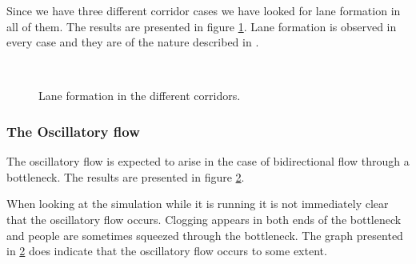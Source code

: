 Since we have three different corridor cases we have looked for lane 
formation in all of them. The results are presented in figure 
\ref{fig:laneformation}. Lane formation is observed in every case 
and they are of the nature described in \cite{self-org}.\\

\begin{figure}[h]
\centering
\subfloat[]{\resizebox{8cm}{!}{}}
\subfloat[]{\resizebox{8cm}{!}{}}\\
\subfloat[]{\resizebox{8cm}{!}{}}
\caption{Lane formation in the different corridors.}
\label{fig:laneformation}
\end{figure}

\subsubsection{The Oscillatory flow}
The oscillatory flow is expected to arise in the case of bidirectional 
flow through a bottleneck. The results are presented in figure
\ref{fig:oscillitoryflow}.\\

\begin{figure}[h]
\centering
{}
\caption{}
\label{fig:oscillitoryflow}
\end{figure}

When looking at the simulation while it is running it is not 
immediately clear that the oscillatory flow occurs. Clogging 
appears in both ends of the bottleneck and people are sometimes 
squeezed through the bottleneck. The graph presented in 
\ref{fig:oscillitoryflow} does indicate that the oscillatory 
flow occurs to some extent.